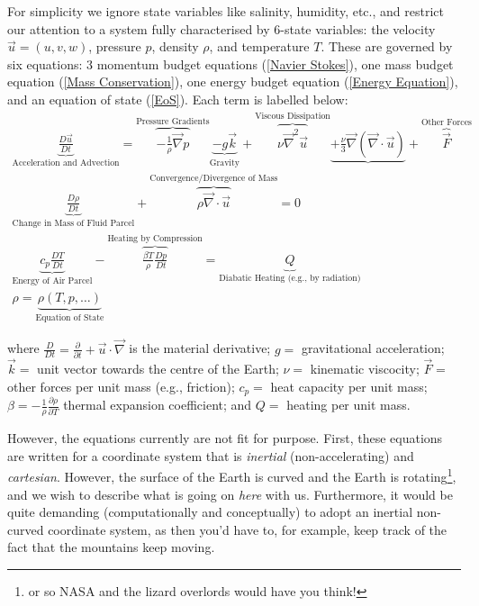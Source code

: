 For simplicity we ignore state variables like salinity, humidity, etc., and restrict our attention to a system fully characterised by 6-state variables: the velocity $\vec{u}=(u,v,w)$, pressure $p$, density $\rho$, and temperature $T$. These are governed by six equations: 3 momentum budget equations (\ref{Navier Stokes}), one mass budget equation (\ref{Mass Conservation}), one energy budget equation (\ref{Energy Equation}), and an equation of state (\ref{EoS}). Each term is labelled below:
\begin{gather}
    \boxed{\underbrace{\frac{D\vec{u}}{Dt}}_{\text{Acceleration and Advection}}
    =\overbrace{-\frac{1}{\rho}\vec{\nabla}p}^\text{Pressure Gradients}\underbrace{-g\vec{k}}_\text{Gravity}+\overbrace{\nu\vec{\nabla}^2\vec{u}}^\text{Viscous Dissipation}\underbrace{+\frac{\nu}{3}\vec{\nabla}(\vec{\nabla}\cdot\vec{u})}_\text{}+\overbrace{\vec{F}}^\text{Other Forces}}
    \label{Navier Stokes}
    \\
    \boxed{\underbrace{\frac{D\rho}{Dt}}_\text{Change in Mass of Fluid Parcel}
    +
    \overbrace{\rho\vec{\nabla}\cdot\vec{u}}^\text{Convergence/Divergence of Mass}=0}
    \label{Mass Conservation}
    \\
    \boxed{\underbrace{c_p\frac{DT}{Dt}}_\text{Energy of Air Parcel}-\overbrace{\frac{\beta T}{\rho}\frac{Dp}{Dt}}^\text{Heating by Compression}=\underbrace{Q}_\text{Diabatic Heating (e.g., by radiation)}}
    \label{Energy Equation}
    \\
    \boxed{\rho=\underbrace{\rho(T,p,\ldots)}_{\text{Equation of State}}}
    \label{EoS}
\end{gather}

\noindent where $\frac{D}{Dt}=\frac{\partial}{\partial t}+\vec{u}\cdot\vec{\nabla}$ is the material derivative; $g=$ gravitational acceleration; $\vec{k}=$ unit vector towards the centre of the Earth; $\nu=$ kinematic viscocity; $\vec{F}=$ other forces per unit mass (e.g., friction); $c_p=$ heat capacity per unit mass; $\beta=-\frac{1}{\rho}\frac{\partial \rho}{\partial T}$ thermal expansion coefficient; and $Q=$ heating per unit mass.

However, the equations currently are not fit for purpose. First, these equations are written for a coordinate system that is \textit{inertial} (non-accelerating) and \textit{cartesian}. However, the surface of the Earth is curved and the Earth is rotating\footnote{or so NASA and the lizard overlords would have you think!}, and we wish to describe what is going on \textit{here} with us. Furthermore, it would be quite demanding (computationally and conceptually) to adopt an inertial non-curved coordinate system, as then you'd have to, for example, keep track of the fact that the mountains keep moving. 

